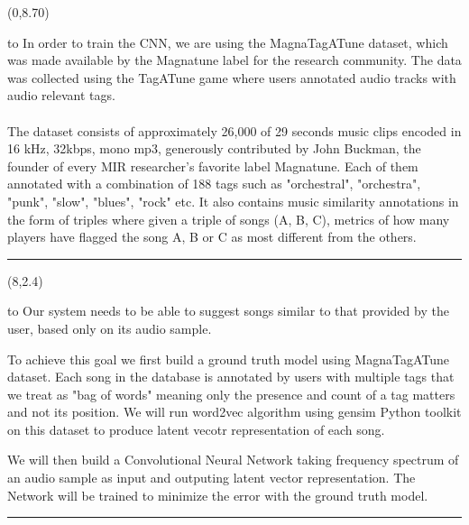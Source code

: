 \documentclass[a0]{a0poster}
\def\Head#1{
  \noindent\hbox to \hsize{\hfil{\LARGE\color{DarkBlue}\sf #1}}\bigskip}
\begin{document}
  \begin{textblock}{7}(0,8.70)
    \Head{Dataset}
    \sf
    In order to train the CNN, we are using the MagnaTagATune dataset, which
    was made available by the Magnatune label for the research community. The
    data was collected using the TagATune game where users annotated audio
    tracks with audio relevant tags.
    \\ \\
    The dataset consists of approximately 26,000 of 29 seconds music clips
    encoded in 16 kHz, 32kbps, mono mp3, generously contributed by John
    Buckman, the founder of every MIR researcher's favorite label Magnatune.
    Each of them annotated with a combination of 188 tags such as "orchestral",
    "orchestra", "punk", "slow", "blues", "rock" etc. It also contains music
    similarity annotations in the form of triples where given a triple of songs
    (A, B, C), metrics of how many players have flagged the song A, B or C as
    most different from the others.

    \bigskip
    \hrule
  \end{textblock}

  \begin{textblock}{7}(8,2.4)
    \Head{Architecture}
    \sf
    Our system needs to be able to suggest songs similar to that provided by
    the user, based only on its audio sample.

    To achieve this goal we first build a ground truth model using 
    MagnaTagATune dataset. Each song in the database is annotated by users with
    multiple tags that we treat as "bag of words" meaning only the presence and
    count of a tag matters and not its position. We will run word2vec algorithm
    using gensim Python toolkit on this dataset to produce latent vecotr
    representation of each song.

    We will then build a Convolutional Neural Network taking frequency spectrum
    of an audio sample as input and outputing latent vector representation. The
    Network will be trained to minimize the error with the ground truth model.

    \bigskip
    \hrule
  \end{textblock}
\end{document}
